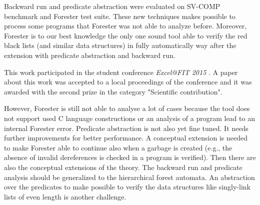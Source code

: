 Backward run and predicate abstraction were evaluated on SV-COMP benchmark and
Forester test suite.
These new techniques makes possible to process some programs that Forester was not able
to analyze before.
Moreover, Forester is to our best knowledge the only one sound tool
able to verify the red black lists (and similar data structures)
in fully automatically way after the extension with predicate abstraction and backward run.

This work participated in the student conference \emph{Excel@FIT 2015} \cite{www:excel}.
A paper about this work was accepted to a local proceedings of the conference
and it was awarded with the second prize in the category "Scientific contribution".

However, Forester is still not able to analyse a lot of cases
because the tool does not support used C language constructions
or an analysis of a program lead to an internal Forester error.
Predicate abstraction is not also yet fine tuned.
It needs further improvements for better performance.
A conceptual extension is needed to make Forester able to continue also
when a garbage is created (e.g., the absence of invalid
dereferences is checked in a program is verified).
Then there are also the conceptual extensions of the theory.
The backward run and predicate analysis should be generalized
to the hierarchical forest automata.
An abstraction over the predicates to make possible to verify
the data structures like singly-link lists of even length is
another challenge.
